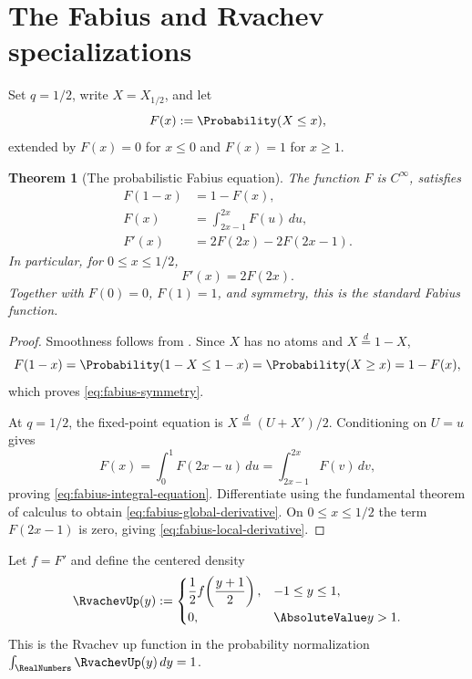 \documentclass[11pt,a4paper,oneside,openany]{book}
\newtheorem{theorem}{Theorem}[chapter]
\theoremstyle{definition}
\theoremstyle{remark}
\begin{document}
\section{The Fabius and Rvachev specializations}

Set $q=1/2$, write $X=X_{1/2}$, and let
\[
 F(x):=\Probability(X\le x),
\]
extended by $F(x)=0$ for $x\le0$ and $F(x)=1$ for $x\ge1$.

\begin{theorem}[The probabilistic Fabius equation]\label{thm:probabilistic-fabius}
The function $F$ is $C^\infty$, satisfies
\begin{align}
 F(1-x)&=1-F(x),\label{eq:fabius-symmetry}\\
 F(x)&=\int_{2x-1}^{2x}F(u)\,du,\label{eq:fabius-integral-equation}\\
 F'(x)&=2F(2x)-2F(2x-1).\label{eq:fabius-global-derivative}
\end{align}
In particular, for $0\le x\le1/2$,
\begin{equation}\label{eq:fabius-local-derivative}
 F'(x)=2F(2x).
\end{equation}
Together with $F(0)=0$, $F(1)=1$, and symmetry, this is the standard Fabius function.
\end{theorem}

\begin{proof}
Smoothness follows from .  Since $X$ has no atoms and $X\overset d=1-X$,
\[
 F(1-x)=\Probability(1-X\le1-x)
 =\Probability(X\ge x)=1-F(x),
\]
which proves \eqref{eq:fabius-symmetry}.

At $q=1/2$, the fixed-point equation is
$X\overset d=(U+X')/2$.  Conditioning on $U=u$ gives
\[
 F(x)=\int_0^1F(2x-u)\,du
 =\int_{2x-1}^{2x}F(v)\,dv,
\]
proving \eqref{eq:fabius-integral-equation}.  Differentiate using the fundamental theorem of calculus to obtain
\eqref{eq:fabius-global-derivative}.  On $0\le x\le1/2$ the term $F(2x-1)$ is zero, giving \eqref{eq:fabius-local-derivative}.
\end{proof}

Let $f=F'$ and define the centered density
\begin{equation}\label{eq:up-definition}
 \RvachevUp(y):=
 \begin{cases}
  \dfrac12 f\!\left(\dfrac{y+1}{2}\right),&-1\le y\le1,\\[6pt]
  0,&\AbsoluteValue y>1.
 \end{cases}
\end{equation}
This is the Rvachev up function in the probability normalization
$\int_{\RealNumbers}\RvachevUp(y)\,dy=1$.
\end{document}
